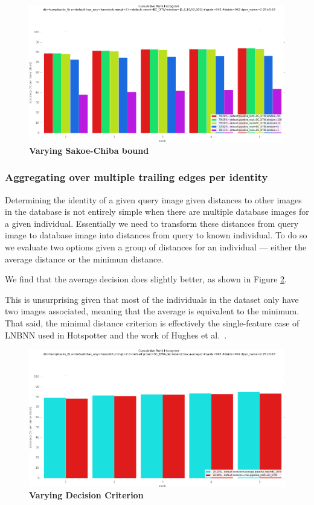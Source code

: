 \begin{figure}[t]%
\centering
\includegraphics[width=1\textwidth]{../images/results/vary_window.png}
\caption[]{\textbf{Varying Sakoe-Chiba bound}}
\label{fig:vary_window}
\end{figure}

\subsubsection{Aggregating over multiple trailing edges per identity}

Determining the identity of a given query image given distances to other images in the database is not entirely simple when there are multiple database images for a given individual.
Essentially we need to transform these distances from query image to database image into distances from query to known individual.
To do so we evaluate two options given a group of distances for an individual --- either the average distance or the minimum distance.

We find that the average decision does slightly better, as shown in Figure \ref{fig:vary_decision}.

This is unsurprising given that most of the individuals in the dataset only have two images associated, meaning that the average is equivalent to the minimum.
That said, the minimal distance criterion is effectively the single-feature case of LNBNN used in Hotspotter \cite{crall_hotspotter_2013} and the work of Hughes et al.\ \cite{hughes2015automated}. %

\begin{figure}[t]%
\centering
\includegraphics[width=1\textwidth]{../images/results/vary_decision.png}
\caption[]{\textbf{Varying Decision Criterion}}
\label{fig:vary_decision}
\end{figure}

